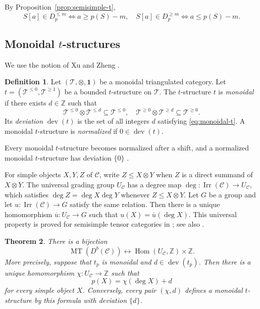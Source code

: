\documentclass[11pt]{amsart}
\newcommand{\C}{\mathcal C}
\newcommand{\T}{\mathcal T}
\newcommand{\one}{\mathbf 1}
\newcommand{\Irr}{\operatorname{Irr}}
\newcommand{\dev}{\operatorname{dev}}
\newcommand{\MT}{\operatorname{MT}}
\DeclareMathOperator{\Hom}{Hom}
\newtheorem{theorem}{Theorem}[section]
\theoremstyle{definition}
\newtheorem{definition}[theorem]{Definition}
\theoremstyle{remark}
\theoremstyle{plain}
\begin{document}
By Proposition~\ref{prop:semisimple-t},
\begin{equation}\label{eq:shifted-halves}
S[a]\in D_p^{\leq m}\Longleftrightarrow a\geq p(S)-m,\quad S[a]\in D_p^{\geq m}\Longleftrightarrow a\leq p(S)-m.
\end{equation}

\subsection{Monoidal \texorpdfstring{$t$}{t}-structures}\label{subsec:monoidal-classification}

We use the notion of Xu and Zheng \cite[Definition~2.10]{XuZheng}.

\begin{definition}\label{def:monoidal-t-structure}
Let $(\T,\otimes,\one)$ be a monoidal triangulated category. Let $t=(\T^{\leq0},\T^{\geq1})$ be a bounded $t$-structure on $\T$. The $t$-structure $t$ is \emph{monoidal} if there exists $d\in\mathbb Z$ such that
\begin{equation}\label{eq:monoidal-t}
\T^{\leq0}\otimes\T^{\leq d}\subseteq\T^{\leq0},\quad \T^{\geq0}\otimes\T^{\geq d}\subseteq\T^{\geq0}.
\end{equation}
Its \emph{deviation} $\dev(t)$ is the set of all integers $d$ satisfying \eqref{eq:monoidal-t}. A monoidal $t$-structure is \emph{normalized} if $0\in\dev(t)$.
\end{definition}

Every monoidal $t$-structure becomes normalized after a shift, and a normalized monoidal $t$-structure has deviation $\{0\}$ \cite[Lemma~2.11 and Proposition~2.15]{XuZheng}.

For simple objects $X,Y,Z$ of $\C$, write $Z\leq X\otimes Y$ when $Z$ is a direct summand of $X\otimes Y$. The universal grading group $U_{\C}$ has a degree map $\deg:\Irr(\C)\to U_{\C}$, which satisfies $\deg Z=\deg X\deg Y$ whenever $Z\leq X\otimes Y$. Let $G$ be a group and let $u:\Irr(\C)\to G$ satisfy the same relation. Then there is a unique homomorphism $\overline u: U_{\C}\to G$ such that $u(X)=\overline u(\deg X)$. This universal property is proved for semisimple tensor categories in \cite[Lemma~2.1]{ENOtwisted}; see also \cite[Section~4.14]{EGNO}.

\begin{theorem}\label{thm:monoidal-classification}
There is a bijection 
\begin{equation*}
    \MT(D^b(\C)) \longleftrightarrow \Hom(U_{\C},\mathbb Z)\times\mathbb Z.
\end{equation*}
More precisely, suppose that $t_p$ is monoidal and $d\in\dev(t_p)$. Then there is a unique homomorphism $\chi: U_{\C}\to\mathbb Z$ such that
\begin{equation}\label{eq:p-character-d}
p(X)=\chi(\deg X)+d
\end{equation}
for every simple object $X$. Conversely, every pair $(\chi,d)$ defines a monoidal $t$-structure by this formula with deviation $\{d\}$.
\end{theorem}
\end{document}
